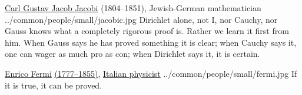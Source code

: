 \qboxnpq
  {
    \href{http://en.wikipedia.org/wiki/Carl_Gustav_Jakob_Jacobi}{Carl Gustav Jacob Jacobi}
    (1804--1851), Jewish-German mathematician
    \footnotemark
  }
  {../common/people/small/jacobic.jpg}
  {Dirichlet alone, not I, nor Cauchy, nor Gauss knows what a completely rigorous proof is.
   Rather we learn it first from him.
   When Gauss says he has proved something it is clear;
   when Cauchy says it, one can wager as much pro as con;
   when Dirichlet says it, it is certain.}

\qboxnps
  {
    \href{http://en.wikipedia.org/wiki/Enrico_Fermi}{Enrico Fermi}
    \href{http://www-history.mcs.st-andrews.ac.uk/Timelines/TimelineG.html}{(1777--1855)},
    \href{http://www-history.mcs.st-andrews.ac.uk/BirthplaceMaps/Places/Italy.html}{Italian physicist}
    \footnotemark
  }
  {../common/people/small/fermi.jpg}
  {If it is true, it can be proved.}



